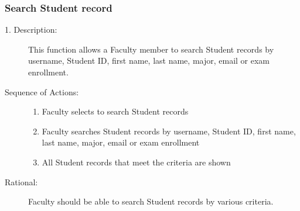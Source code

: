    \subsubsection{\large Search Student record} 
   \begin{boxed} %
      \begin{description}
         \item[1. Description:\label{desc:search_record}]
      This function allows a Faculty member to search Student records by
      username, Student ID, first name, last name, major, email or exam
      enrollment.
         
            \item[Sequence of Actions:]\hspace{10cm}
         \begin{enumerate}
            \item Faculty selects to search Student records
            \item Faculty searches Student records by username, Student ID,
               first name, last name, major, email or exam enrollment
            \item All Student records that meet the criteria are shown
      \end{enumerate}

            \item[Rational:]
         Faculty should be able to search Student records by various criteria.
      \end{description}
   \end{boxed} %

